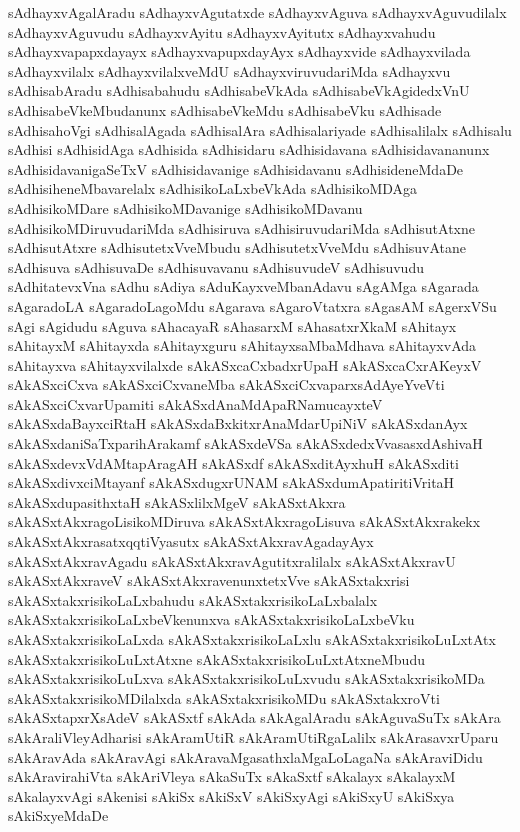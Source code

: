 {sAdhayxvAgalAradu
sAdhayxvAgutatxde
sAdhayxvAguva
sAdhayxvAguvudilalx
sAdhayxvAguvudu
sAdhayxvAyitu
sAdhayxvAyitutx
sAdhayxvahudu
sAdhayxvapapxdayayx
sAdhayxvapupxdayAyx
sAdhayxvide
sAdhayxvilada
sAdhayxvilalx
sAdhayxvilalxveMdU
sAdhayxviruvudariMda
sAdhayxvu
sAdhisabAradu
sAdhisabahudu
sAdhisabeVkAda
sAdhisabeVkAgidedxVnU
sAdhisabeVkeMbudanunx
sAdhisabeVkeMdu
sAdhisabeVku
sAdhisade
sAdhisahoVgi
sAdhisalAgada
sAdhisalAra
sAdhisalariyade
sAdhisalilalx
sAdhisalu
sAdhisi
sAdhisidAga
sAdhisida
sAdhisidaru
sAdhisidavana
sAdhisidavananunx
sAdhisidavanigaSeTxV
sAdhisidavanige
sAdhisidavanu
sAdhisideneMdaDe
sAdhisiheneMbavarelalx
sAdhisikoLaLxbeVkAda
sAdhisikoMDAga
sAdhisikoMDare
sAdhisikoMDavanige
sAdhisikoMDavanu
sAdhisikoMDiruvudariMda
sAdhisiruva
sAdhisiruvudariMda
sAdhisutAtxne
sAdhisutAtxre
sAdhisutetxVveMbudu
sAdhisutetxVveMdu
sAdhisuvAtane
sAdhisuva
sAdhisuvaDe
sAdhisuvavanu
sAdhisuvudeV
sAdhisuvudu
sAdhitatevxVna
sAdhu
sAdiya
sAduKayxveMbanAdavu
sAgAMga
sAgarada
sAgaradoLA
sAgaradoLagoMdu
sAgarava
sAgaroVtatxra
sAgasAM
sAgerxVSu
sAgi
sAgidudu
sAguva
sAhacayaR
sAhasarxM
sAhasatxrXkaM
sAhitayx
sAhitayxM
sAhitayxda
sAhitayxguru
sAhitayxsaMbaMdhava
sAhitayxvAda
sAhitayxva
sAhitayxvilalxde
sAkASxcaCxbadxrUpaH
sAkASxcaCxrAKeyxV
sAkASxciCxva
sAkASxciCxvaneMba
sAkASxciCxvaparxsAdAyeYveVti
sAkASxciCxvarUpamiti
sAkASxdAnaMdApaRNamucayxteV
sAkASxdaBayxciRtaH
sAkASxdaBxkitxrAnaMdarUpiNiV
sAkASxdanAyx
sAkASxdaniSaTxparihArakamf
sAkASxdeVSa
sAkASxdedxVvasasxdAshivaH
sAkASxdevxVdAMtapAragAH
sAkASxdf
sAkASxditAyxhuH
sAkASxditi
sAkASxdivxciMtayanf
sAkASxdugxrUNAM
sAkASxdumApatiritiVritaH
sAkASxdupasithxtaH
sAkASxlilxMgeV
sAkASxtAkxra
sAkASxtAkxragoLisikoMDiruva
sAkASxtAkxragoLisuva
sAkASxtAkxrakekx
sAkASxtAkxrasatxqqtiVyasutx
sAkASxtAkxravAgadayAyx
sAkASxtAkxravAgadu
sAkASxtAkxravAgutitxralilalx
sAkASxtAkxravU
sAkASxtAkxraveV
sAkASxtAkxravenunxtetxVve
sAkASxtakxrisi
sAkASxtakxrisikoLaLxbahudu
sAkASxtakxrisikoLaLxbalalx
sAkASxtakxrisikoLaLxbeVkenunxva
sAkASxtakxrisikoLaLxbeVku
sAkASxtakxrisikoLaLxda
sAkASxtakxrisikoLaLxlu
sAkASxtakxrisikoLuLxtAtx
sAkASxtakxrisikoLuLxtAtxne
sAkASxtakxrisikoLuLxtAtxneMbudu
sAkASxtakxrisikoLuLxva
sAkASxtakxrisikoLuLxvudu
sAkASxtakxrisikoMDa
sAkASxtakxrisikoMDilalxda
sAkASxtakxrisikoMDu
sAkASxtakxroVti
sAkASxtapxrXsAdeV
sAkASxtf
sAkAda
sAkAgalAradu
sAkAguvaSuTx
sAkAra
sAkAraliVleyAdharisi
sAkAramUtiR
sAkAramUtiRgaLalilx
sAkArasavxrUparu
sAkAravAda
sAkAravAgi
sAkAravaMgasathxlaMgaLoLagaNa
sAkAraviDidu
sAkAravirahiVta
sAkAriVleya
sAkaSuTx
sAkaSxtf
sAkalayx
sAkalayxM
sAkalayxvAgi
sAkenisi
sAkiSx
sAkiSxV
sAkiSxyAgi
sAkiSxyU
sAkiSxya
sAkiSxyeMdaDe
}
